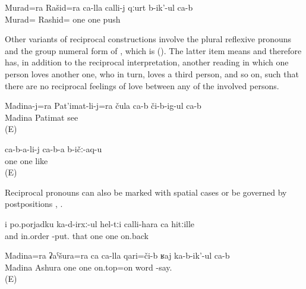 \begin{exe}
	\ex	\label{ex:Murad and Rashid push each other.GEN}
	\gll	Murad=ra Rašid=ra ca-lla calli-j qːurt b-ik'-ul ca-b\\
	Murad= Rashid= one	one	push  \\
	\glt	{}
\end{exe}


Other variants of reciprocal constructions involve the plural reflexive pronouns  and the group numeral form of  , which is   (). The latter item means  and therefore  has, in addition to the reciprocal interpretation, another reading in which one person loves another one, who in turn, loves a third person, and so on, such that there are no reciprocal feelings of love between any of the involved persons.
%
\begin{exe}
		\ex	\label{ex:Madina and Patimat see each other@14a}
		\gll	Madina-j=ra	Pat'imat-li-j=ra	čula	ca-b 	či-b-ig-ul	ca-b\\
			Madina	Patimat			see	\\
		\glt	{} (E)

		\ex	\label{ex:(They) love each other@14b}
		\gll	ca-b-a-li-j	ca-b-a	b-ičː-aq-u\\
			one	one	like\\
		\glt	{} (E)

\end{exe}

Reciprocal pronouns can also be marked with spatial cases  or be governed by postpositions , .
%
\begin{exe}
	\ex	\label{ex:and putting them in order one after the other}
	\gll	i	po.porjadku	ka-d-irxː-ul	hel-tːi	calli-hara	ca	hitːille\\
		and	in.order	-put.	that	one	one	on.back\\
	\glt	{}

	\ex	\label{ex:Madina and Ashura talk about each other}
	\gll	Madina=ra	ʡaˁšura=ra	ca	ca-lla	qari=či-b	ʁaj	ka-b-ik'-ul	ca-b\\
		Madina	Ashura	one	one	on.top=on	word	-say.	\\
	\glt	{} (E)
\end{exe}

